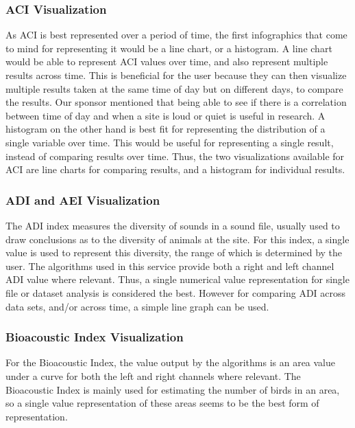 \subsubsection{ACI Visualization}
As ACI is best represented over a period of time, the first infographics that come to mind for representing it would be a line chart, or a histogram. A line chart would be able to represent ACI values over time, and also represent multiple results across time. This is beneficial for the user because they can then visualize multiple results taken at the same time of day but on different days, to compare the results. Our sponsor mentioned that being able to see if there is a correlation between time of day and when a site is loud or quiet is useful in research. A histogram on the other hand is best fit for representing the distribution of a single variable over time. This would be useful for representing a single result, instead of comparing results over time. Thus, the two visualizations available for ACI are line charts for comparing results, and a histogram for individual results.

\subsubsection{ADI and AEI Visualization}
The ADI index measures the diversity of sounds in a sound file, usually used to draw conclusions as to the diversity of animals at the site. For this index, a single value is used to represent this diversity, the range of which is determined by the user. The algorithms used in this service provide both a right and left channel ADI value where relevant. Thus, a single numerical value representation for single file or dataset analysis is considered the best. However for comparing ADI across data sets, and/or across time, a simple line graph can be used.

\subsubsection{Bioacoustic Index Visualization}
For the Bioacoustic Index, the value output by the algorithms is an area value under a curve for both the left and right channels where relevant. The Bioacoustic Index is mainly used for estimating the number of birds in an area, so a single value representation of these areas seems to be the best form of representation.
